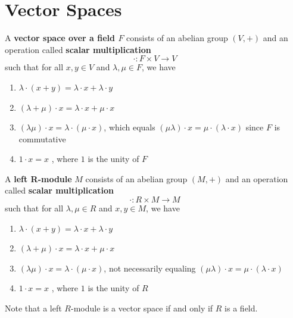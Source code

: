 \section{Vector Spaces}

  \begin{definition}
    \label{def:vector-space}
    A \textbf{vector space over a field $F$} consists of an abelian group $(V, +)$ and an operation called \textbf{scalar multiplication} 
    \begin{equation}
      \cdot: F \times V \rightarrow V
    \end{equation}
    such that for all $x, y\in V$ and $\lambda, \mu \in F$, we have 
    \begin{enumerate}
      \item $\lambda \cdot (x + y) = \lambda \cdot x + \lambda \cdot y$
      \item $(\lambda + \mu) \cdot x = \lambda \cdot x + \mu \cdot x$ 
      \item $(\lambda \mu) \cdot x = \lambda \cdot (\mu \cdot x )$, which equals $(\mu \lambda) \cdot x = \mu \cdot (\lambda \cdot x)$ since $F$ is commutative 
      \item $1 \cdot x = x$ , where $1$ is the unity of $F$
    \end{enumerate}
  \end{definition}

  \begin{definition}
    A \textbf{left R-module} $M$ consists of an abelian group $(M, +)$ and an operation called \textbf{scalar multiplication}
    \begin{equation}
      \cdot: R \times M \longrightarrow M
    \end{equation}
    such that for all $\lambda, \mu \in R$ and $x, y \in M$, we have 
    \begin{enumerate}
      \item $\lambda \cdot (x + y) = \lambda \cdot x + \lambda \cdot y$
      \item $(\lambda + \mu) \cdot x = \lambda \cdot x + \mu \cdot x$ 
      \item $(\lambda \mu) \cdot x = \lambda \cdot (\mu \cdot x )$, not necessarily equaling $(\mu \lambda) \cdot x = \mu \cdot (\lambda \cdot x)$
      \item $1 \cdot x = x$ , where $1$ is the unity of $R$
    \end{enumerate}
    Note that a left $R$-module is a vector space if and only if $R$ is a field.
  \end{definition}

